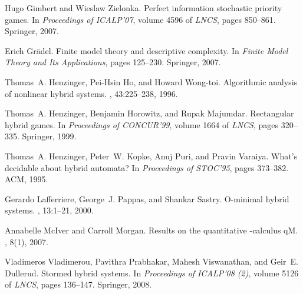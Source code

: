 \documentclass[fleqn,envcountsame]{LMCS}
\begin{document}
\begin{thebibliography}{10}
Hugo Gimbert and Wieslaw Zielonka.
\newblock Perfect information stochastic priority games.
\newblock In {\em Proceedings of ICALP'07}, volume 4596 of {\em LNCS}, pages
  850--861. Springer, 2007.

Erich Gr{\"a}del.
\newblock Finite model theory and descriptive complexity.
\newblock In {\em Finite Model Theory and Its Applications}, pages 125--230.
  Springer, 2007.

Thomas~A. Henzinger, Pei-Hsin Ho, and Howard Wong-toi.
\newblock Algorithmic analysis of nonlinear hybrid systems.
, 43:225--238, 1996.

Thomas~A. Henzinger, Benjamin Horowitz, and Rupak Majumdar.
\newblock Rectangular hybrid games.
\newblock In {\em Proceedings of CONCUR'99}, volume 1664 of {\em LNCS}, pages
  320--335. Springer, 1999.

Thomas~A. Henzinger, Peter~W. Kopke, Anuj Puri, and Pravin Varaiya.
\newblock What's decidable about hybrid automata?
\newblock In {\em Proceedings of STOC'95}, pages 373--382. ACM, 1995.

Gerardo Lafferriere, George~J. Pappas, and Shankar Sastry.
\newblock O-minimal hybrid systems.
, 13:1--21, 2000.

Annabelle McIver and Carroll Morgan.
\newblock Results on the quantitative -calculus q{M}{}.
, 8(1), 2007.

Vladimeros Vladimerou, Pavithra Prabhakar, Mahesh Viswanathan, and Geir~E.
  Dullerud.
\newblock Stormed hybrid systems.
\newblock In {\em Proceedings of ICALP'08 (2)}, volume 5126 of {\em LNCS},
  pages 136--147. Springer, 2008.

\end{thebibliography}
\end{document}
